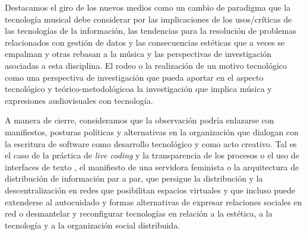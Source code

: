 Destacamos el giro de los nuevos medios como un cambio de paradigma que la tecnología musical debe considerar por las implicaciones de los usos/críticas de las tecnologías de la información, las tendencias para la resolución de problemas relacionados con gestión de datos y las consecuencias estéticas que a veces se empalman y otras rebasan a la música y las perspectivas de investigación asociadas a esta disciplina. El rodeo o la realización de un motivo tecnológico como una perspectiva de investigación que pueda aportar en el aspecto tecnológico y teórico-metodológicoa la investigación que implica música y expresiones audiovisuales con tecnología.


A manera de cierre, consideramos que la observación podría enlazarse con manifiestos, posturas políticas y alternativas en la organización que dialogan con la escritura de software como desarrollo tecnológico y como acto creativo. Tal es el caso de la práctica de \textit{live coding} y la transparencia de los procesos o el uso de interfaces de texto \citep{collinsLivecoding}, el manifiesto de una servidora feminista \citep{feministserver} o la arquitectura de distribución de información par a par, que persigue la distribución y la descentralización en redes que posibilitan espacios virtuales \citep{cyberspace} y que incluso puede extenderse al autocuidado y formas alternativas de expresar relaciones sociales en red \citep{dwc} o desmantelar y reconfigurar tecnologías en relación a la estética, a la tecnología y a la organización social distribuida. 









